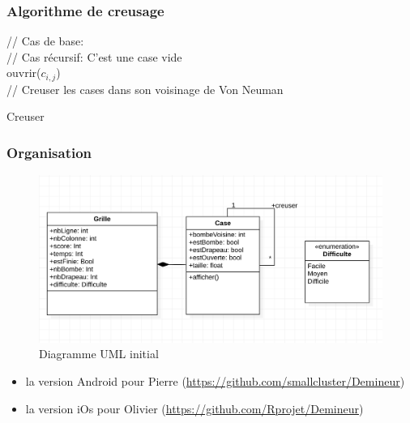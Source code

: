 \documentclass{beamer}
\begin{document}
\begin{frame}
  \frametitle{Algorithme de creusage}
  \begin{algorithm}[H]
	// Cas de base:\\
	// Cas récursif: C'est une case vide\\
	ouvrir($c_{i,j}$)\\
	// Creuser les cases dans son voisinage de Von Neuman\\
	\caption{Creuser}
\end{algorithm}

\end{frame}


\begin{frame}
  \frametitle{Organisation}
    \begin{figure}[H]
        \centering
        \includegraphics[width=0.6\linewidth]{Ressources/Diagramme_UML.png}
        \caption{Diagramme UML initial}
    \end{figure}
  \begin{itemize}
    \item  la version Android pour Pierre (\url{https://github.com/smallcluster/Demineur})
    \item  la version iOs pour Olivier (\url{https://github.com/Rprojet/Demineur})
  \end{itemize}
\end{frame}
\end{document}
